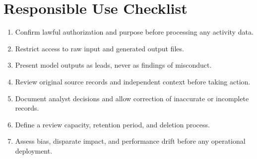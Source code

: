 \documentclass[12pt,a4paper,oneside]{report}
\begin{document}
\section{Responsible Use Checklist}
\begin{enumerate}
  \item Confirm lawful authorization and purpose before processing any
        activity data.
  \item Restrict access to raw input and generated output files.
  \item Present model outputs as leads, never as findings of misconduct.
  \item Review original source records and independent context before
        taking action.
  \item Document analyst decisions and allow correction of inaccurate
        or incomplete records.
  \item Define a review capacity, retention period, and deletion process.
  \item Assess bias, disparate impact, and performance drift before any
        operational deployment.
\end{enumerate}
\end{document}
